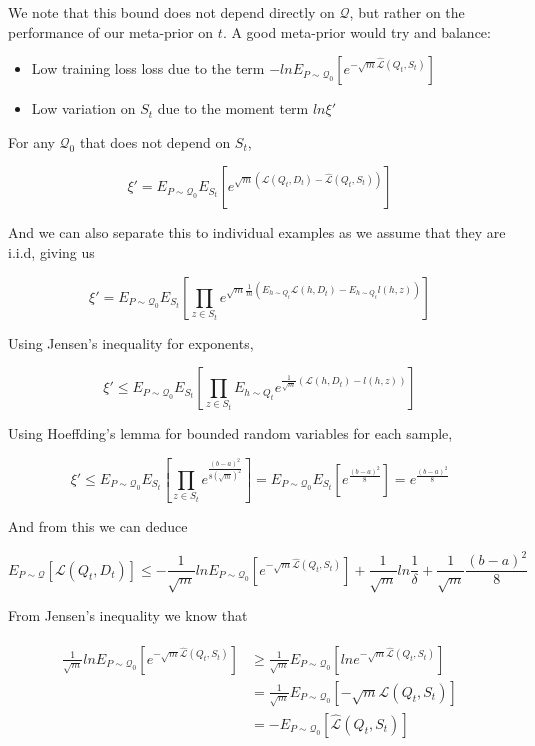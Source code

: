 \documentclass[letterpaper]{article}
\theoremstyle{definition}
\begin{document}
We note that this bound does not depend directly on $\mathcal{Q}$, but rather on the performance of our meta-prior on $t$. A good meta-prior would try and balance:
\begin{itemize}
	\item Low training loss loss due to the term $-lnE_{P\sim \mathcal{Q}_0} \left [e^{-\sqrt{m}\hat{\mathcal{L}}(Q_t, S_t)}\right ]$ 
	\item Low variation on $S_t$ due to the moment term $ln\xi'$
\end{itemize}


For any $\mathcal{Q}_0$ that does not depend on $S_t$, 

$$\xi' = E_{P\sim \mathcal{Q}_0} E_{S_t} \left [ e^{\sqrt{m}\left (\mathcal{L}(Q_t, D_t) - \hat{\mathcal{L}}(Q_t, S_t)\right )}\right ]$$

And we can also separate this to individual examples as we assume that they are i.i.d, giving us 

$$\xi' = E_{P\sim \mathcal{Q}_0} E_{S_t} \left [ \prod_{z\in S_t} e^{\sqrt{m}\frac{1}{m}\left ( E_{h\sim Q_t}\mathcal{L}(h, D_t) - E_{h\sim Q_t}l(h, z)\right )}\right ]$$

Using Jensen's inequality for exponents,

$$\xi' \leq E_{P\sim \mathcal{Q}_0} E_{S_t} \left [ \prod_{z\in S_t} E_{h\sim Q_t} e^{\frac{1}{\sqrt{m}}\left ( \mathcal{L}(h, D_t) - l(h, z)\right )}\right ]$$


Using Hoeffding's lemma for bounded random variables for each sample,

$$ \xi' \leq E_{P\sim \mathcal{Q}_0} E_{S_t} \left [ \prod_{z\in S_t}  e^{\frac{(b-a)^2}{8(\sqrt{m})^2}} \right ] = E_{P\sim \mathcal{Q}_0} E_{S_t} \left [ e^{\frac{(b-a)^2}{8}} \right ] = e^{\frac{(b-a)^2}{8}} $$

And from this we can deduce 

$$  E_{P\sim \mathcal{Q}} \left [\mathcal{L}(Q_t, D_t)\right ] \leq -\frac{1}{\sqrt{m}}ln E_{P\sim \mathcal{Q}_0} \left [e^{-\sqrt{m}\hat{\mathcal{L}}(Q_t, S_t)}\right ] +\frac{1}{\sqrt{m}}ln\frac{1}{\delta} + \frac{1}{\sqrt{m}}\frac{(b-a)^2}{8} $$

From Jensen's inequality we know that 

\begin{align*} 
\begin{split}
\frac{1}{\sqrt{m}}ln E_{P\sim \mathcal{Q}_0} \left [e^{-\sqrt{m}\hat{\mathcal{L}}(Q_t, S_t)}\right ] & \geq \frac{1}{\sqrt{m}} E_{P\sim \mathcal{Q}_0} \left [ln e^{-\sqrt{m}\hat{\mathcal{L}}(Q_t, S_t)}\right ] \\
&= \frac{1}{\sqrt{m}} E_{P\sim \mathcal{Q}_0} \left [-\sqrt{m}\hat{\mathcal{L}}(Q_t, S_t)\right ]\\
&= - E_{P\sim \mathcal{Q}_0} \left [\hat{\mathcal{L}}(Q_t, S_t)\right ]
\end{split}
\end{align*}
\end{document}
